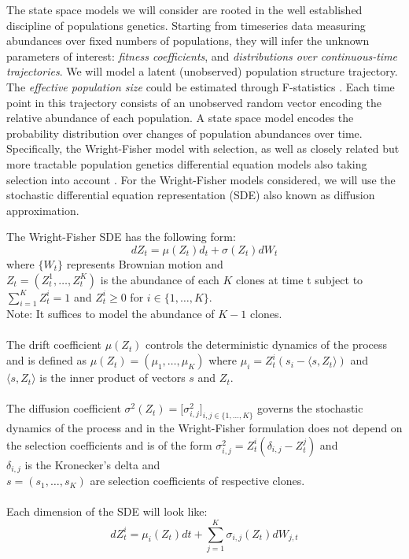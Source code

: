 \documentclass{article}
\begin{document}
The state space models we will consider are rooted in the well established discipline of populations genetics. 
Starting from timeseries data measuring abundances over fixed numbers of populations, they will infer the unknown parameters of interest:  \textit{fitness coefficients}, and \textit{distributions over continuous-time trajectories}.
We will model a latent (unobserved) population structure trajectory.
The \textit{effective population size} could be estimated through F-statistics \cite{jorde1999estimating}.
Each time point in this trajectory consists of an unobserved random vector encoding the relative abundance of each population.
A state space model encodes the probability distribution over changes of population abundances over time.
Specifically, the Wright-Fisher model with selection, as well as closely related but more tractable population genetics differential equation models also taking selection into account \cite{ewens2012mathematical}.
For the Wright-Fisher models considered, we will use the stochastic differential equation representation (SDE) also known as diffusion approximation.

The Wright-Fisher SDE has the following form:
\begin{equation}
dZ_t = \mu (Z_t)d_t + \sigma(Z_t)dW_t
\end{equation}
where $\{W_t\}$ represents Brownian motion and \\
$Z_t = (Z_t^{1}, \ldots, Z_t^{K})$ is the abundance of each $K$ clones at time t
subject to $\sum_{i=1}^{K}Z_t^{i} = 1$ and $Z_t^{i} \ge 0$ for $i \in \{1, \ldots, K\}$.\\
Note: It suffices to model the abundance of $K-1$ clones.\\
\\
The drift coefficient $\mu(Z_t)$ controls the deterministic dynamics of the process and is defined as
$\mu(Z_t) = (\mu_1, \ldots, \mu_K)$
where
$\mu_i = Z_t^{i}(s_i - \langle s, Z_t \rangle)$ and \\
$\langle s, Z_t \rangle$ is the inner product of vectors $s$ and $Z_t$. \\
\\
The diffusion coefficient $\sigma^{2}(Z_t) = \lbrack \sigma^{2}_{i,j} \rbrack_{i,j \in \{1,\ldots, K\}}$
governs the stochastic dynamics of the process and in the Wright-Fisher formulation does not depend on the selection coefficients and is of the form
$\sigma^2_{i,j} = Z_t^i(\delta_{i,j} - Z_t^j)$ and \\ $\delta_{i,j}$ is the Kronecker's delta and \\
$s = (s_1, \ldots, s_K)$ are selection coefficients of respective clones.\\
 \\
Each dimension of the SDE will look like: \\
\begin{equation}
\label{eq:sdecomponent} 
dZ_t^{i} = \mu_i(Z_{t})dt + \sum_{j=1}^K \sigma_{i,j}(Z_t)dW_{j,t}
\end{equation}
\end{document}
